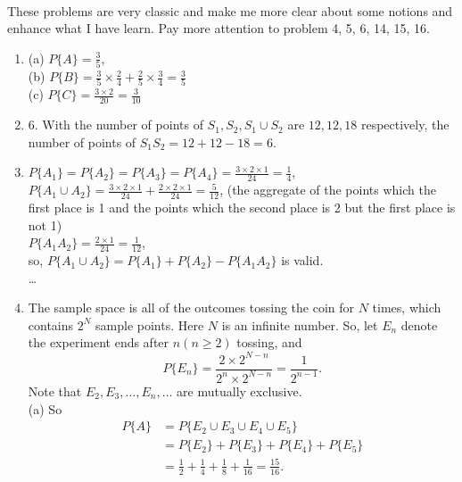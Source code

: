 \documentclass{article}
\numberwithin{equation}{subsection}
\begin{document}
			\paragraph{} These problems are very classic and make me more clear about some notions and enhance what I have learn. Pay more attention to problem 4, 5, 6, 14, 15, 16.
			\begin{enumerate}
			\item (a) $P\{A\} = \frac{3}{5}$, \\ (b) $P\{B\} = \frac{3}{5}\times\frac{2}{4} + \frac{2}{5}\times\frac{3}{4} = \frac{3}{5}$ \\ (c) $P\{C\}=\frac{3\times2}{20} = \frac{3}{10}$  
			\item 6. With the number of points of $S_1, S_2, S_1\cup S_2$ are $12, 12, 18$ respectively, the number of points of $S_1S_2 = 12 + 12 - 18 = 6$. 
			\item $P\{A_1\} = P\{A_2\} = P\{A_3\} = P\{A_4\} = \frac{3\times2\times1}{24} = \frac{1}{4}$, \\ $P\{A_1\cup A_2\}=\frac{3\times2\times1}{24} + \frac{2\times2\times1}{24} = \frac{5}{12}$, (the aggregate of the points which the first place is 1 and the points which the second place is 2 but the first place is not 1) \\ $P\{A_1A_2\} = \frac{2\times1}{24} = \frac{1}{12}$, \\
			so, $P\{A_1\cup A_2\} = P\{A_1\} + P\{A_2\} - P\{A_1A_2\}$ is valid. \\ \dots 
			\item The sample space is all of the outcomes tossing the coin for $N$ times, which contains $2^N$ sample points. Here $N$ is an infinite number. So, let $E_n$ denote the experiment ends after $n (n\geq2)$ tossing, and 
			\begin{equation}
				P\{E_n\} = \frac{2 \times 2^{N-n}}{2^n \times 2^{N-n}} = \frac{1}{2^{n-1}}.
			\end{equation}
			Note that $E_2, E_3,\dots,E_n,\dots$ are mutually exclusive. \\(a) So 
			\begin{equation}
				\begin{aligned}
					P\{A\} &= P\{E_2 \cup E_3 \cup E_4 \cup E_5\} \\
					 &= P\{E_2\} + P\{E_3\} + P\{E_4\} + P\{E_5\} \\ 
					 &= \frac{1}{2} + \frac{1}{4} + \frac{1}{8} + \frac{1}{16} = \frac{15}{16}.
				\end{aligned}
			\end{equation}

\end{enumerate}
\end{document}
